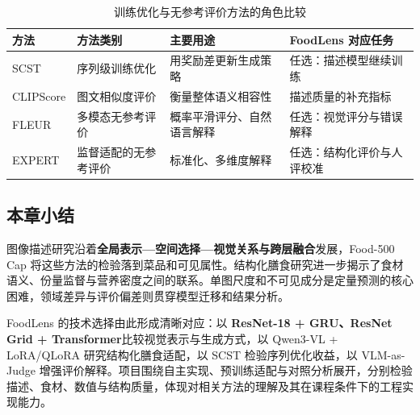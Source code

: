 \begin{table}[!htbp]
 \caption{训练优化与无参考评价方法的角色比较}
 \label{tab:evaluation}
 \centering\small
 \setlength{\tabcolsep}{5pt}\renewcommand{\arraystretch}{1.16}
 \begin{tabularx}{\linewidth}{@{}P{2.1cm}P{2.65cm}YP{3.4cm}@{}}
 \toprule
 \textbf{方法} & \textbf{方法类别} & \textbf{主要用途} & \textbf{FoodLens 对应任务}\\
 \midrule
 SCST & 序列级训练优化 & 用奖励差更新生成策略 & 任选：描述模型继续训练\\
 CLIPScore & 图文相似度评价 & 衡量整体语义相容性 & 描述质量的补充指标\\
 FLEUR & 多模态无参考评价 & 概率平滑评分、自然语言解释 & 任选：视觉评分与错误解释\\
 EXPERT & 监督适配的无参考评价 & 标准化、多维度解释 & 任选：结构化评价与人评校准\\
 \bottomrule
 \end{tabularx}
\end{table}

\FloatBarrier
\subsection{本章小结}
图像描述研究沿着\textbf{全局表示—空间选择—视觉关系与跨层融合}发展，Food-500 Cap 将这些方法的检验落到菜品和可见属性。结构化膳食研究进一步揭示了食材语义、份量监督与营养密度之间的联系。单图尺度和不可见成分是定量预测的核心困难，领域差异与评价偏差则贯穿模型迁移和结果分析。

FoodLens 的技术选择由此形成清晰对应：以 \textbf{ResNet-18 + GRU、ResNet Grid + Transformer}比较视觉表示与生成方式，以 Qwen3-VL + LoRA/QLoRA 研究结构化膳食适配，以 SCST 检验序列优化收益，以 VLM-as-Judge 增强评价解释。项目围绕自主实现、预训练适配与对照分析展开，分别检验描述、食材、数值与结构质量，体现对相关方法的理解及其在课程条件下的工程实现能力。
